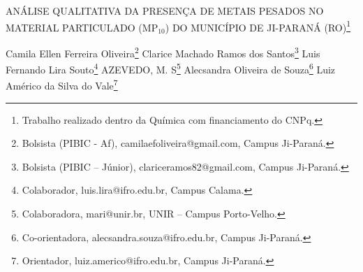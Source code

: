 \documentclass[article,12pt,onesidea,4paper,english,brazil]{abntex2}
\begin{document}
	
	
	\frenchspacing 
	
	\begin{center}
		\LARGE ANÁLISE QUALITATIVA DA PRESENÇA DE METAIS PESADOS NO MATERIAL		
		PARTICULADO (MP$_{10}$) DO MUNICÍPIO DE JI-PARANÁ (RO)\footnote{Trabalho realizado dentro da Química com financiamento do CNPq.}
		
		\normalsize
		Camila Ellen Ferreira Oliveira\footnote{Bolsista (PIBIC - Af), camilaefoliveira@gmail.com, Campus Ji-Paraná.} 
		Clarice Machado Ramos dos Santos\footnote{Bolsista (PIBIC – Júnior), clariceramos82@gmail.com, Campus Ji-Paraná.} 
		Luis Fernando Lira Souto\footnote{Colaborador, luis.lira@ifro.edu.br, Campus Calama.} 
		AZEVEDO, M. S\footnote{Colaboradora, mari@unir.br, UNIR – Campus Porto-Velho.}
		Alecsandra Oliveira de Souza\footnote{Co-orientadora, alecsandra.souza@ifro.edu.br, Campus Ji-Paraná.}
		Luiz Américo da Silva do Vale\footnote{Orientador, luiz.americo@ifro.edu.br, Campus Ji-Paraná.} 
	\end{center}
	
\end{document}

